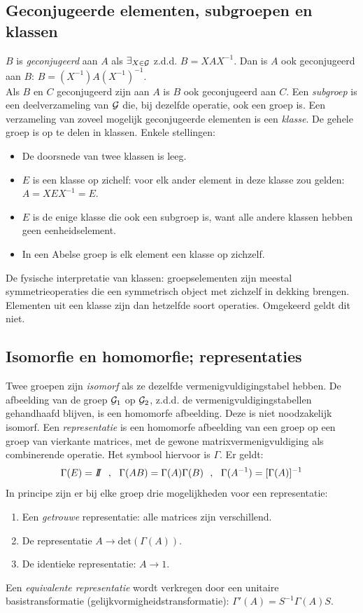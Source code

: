 \documentclass[twoside]{report}
\begin{document}
\subsection{Geconjugeerde elementen, subgroepen en klassen}
$B$ is {\it geconjugeerd} aan $A$ als $\exists_{X\in{\cal{G}}}$ z.d.d. $B=XAX^{-1}$.
Dan is $A$ ook geconjugeerd aan $B$: $B=(X^{-1})A(X^{-1})^{-1}$.\\
Als $B$ en $C$ geconjugeerd zijn aan $A$ is $B$ ook geconjugeerd aan $C$.
\npar
Een {\it subgroep} is een deelverzameling van ${\cal{G}}$ die, bij dezelfde operatie,
ook een groep is.
\npar
Een verzameling van zoveel mogelijk geconjugeerde elementen is een {\it klasse}.
De gehele groep is op te delen in klassen. Enkele stellingen:
\begin{itemize}
\item De doorsnede van twee klassen is leeg.
\item $E$ is een klasse op zichelf: voor elk ander element in deze klasse zou gelden:\\
      $A=XEX^{-1}=E$.
\item $E$ is de enige klasse die ook een subgroep is, want alle andere klassen hebben
      geen eenheidselement.
\item In een Abelse groep is elk element een klasse op zichzelf.
\end{itemize}
De fysische interpretatie van klassen: groepselementen zijn meestal symmetrieoperaties
die een symmetrisch object met zichzelf in dekking brengen. Elementen uit een
klasse zijn dan hetzelfde soort operaties. Omgekeerd geldt dit niet.

\subsection{Isomorfie en homomorfie; representaties}
Twee groepen zijn {\it isomorf} als ze dezelfde vermenigvuldigingstabel hebben.
De afbeelding van de groep ${\cal{G}}_1$ op ${\cal{G}}_2$, z.d.d. de vermenigvuldigingstabellen
gehandhaafd blijven, is een homomorfe afbeelding. Deze is niet noodzakelijk
isomorf.
\npar
Een {\it representatie} is een homomorfe afbeelding van een groep op een groep
van vierkante matrices, met de gewone matrixvermenigvuldiging als combinerende
operatie. Het symbool hiervoor is $\Gamma$. Er geldt:
\[
\Gamma(E)=I\hspace{-0.8ex}I~~,~~\Gamma(AB)=\Gamma(A)\Gamma(B)~~,~~
\Gamma(A^{-1})=[\Gamma(A)]^{-1}
\]
In principe zijn er bij elke groep drie mogelijkheden voor een representatie:
\begin{enumerate}
\item Een {\it getrouwe} representatie: alle matrices zijn verschillend.
\item De representatie $A\rightarrow \mbox{det}(\Gamma(A))$.
\item De identieke representatie: $A\rightarrow1$.
\end{enumerate}
Een {\it equivalente representatie} wordt verkregen door een unitaire basistransformatie
(gelijkvormigheidstransformatie): $\Gamma'(A)=S^{-1}\Gamma(A)S$.
\end{document}
